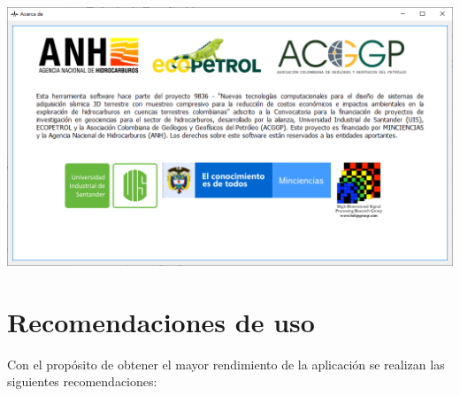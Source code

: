 \documentclass[12pt,twoside,letter]{ol-softwaremanual}
\newenvironment{Figure}
  {\par\medskip\noindent\minipage{\linewidth}}
  {\endminipage\par\medskip}
\begin{document}
\begin{Figure}
    \centering
    \includegraphics[width=1\linewidth]{about.png}
    \label{fig:about_of}
\end{Figure}

\section{Recomendaciones de uso}

Con el propósito de obtener el mayor rendimiento de la aplicación se realizan las siguientes recomendaciones:
\end{document}
